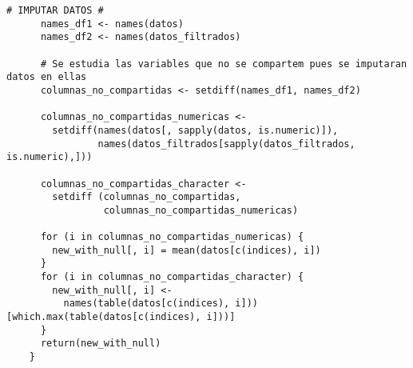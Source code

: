 \begin{multicols}{2}
\begin{lstlisting}[style=mystyle]
      # IMPUTAR DATOS #
      names_df1 <- names(datos)
      names_df2 <- names(datos_filtrados)
      
      # Se estudia las variables que no se compartem pues se imputaran datos en ellas
      columnas_no_compartidas <- setdiff(names_df1, names_df2)
      
      columnas_no_compartidas_numericas <-
        setdiff(names(datos[, sapply(datos, is.numeric)]),
                names(datos_filtrados[sapply(datos_filtrados, is.numeric),]))
    
      columnas_no_compartidas_character <-
        setdiff (columnas_no_compartidas,
                 columnas_no_compartidas_numericas)
      
      for (i in columnas_no_compartidas_numericas) {
        new_with_null[, i] = mean(datos[c(indices), i])
      }
      for (i in columnas_no_compartidas_character) {
        new_with_null[, i] <-
          names(table(datos[c(indices), i]))[which.max(table(datos[c(indices), i]))]
      }
      return(new_with_null)
    }
  \end{lstlisting}
\end{multicols}

